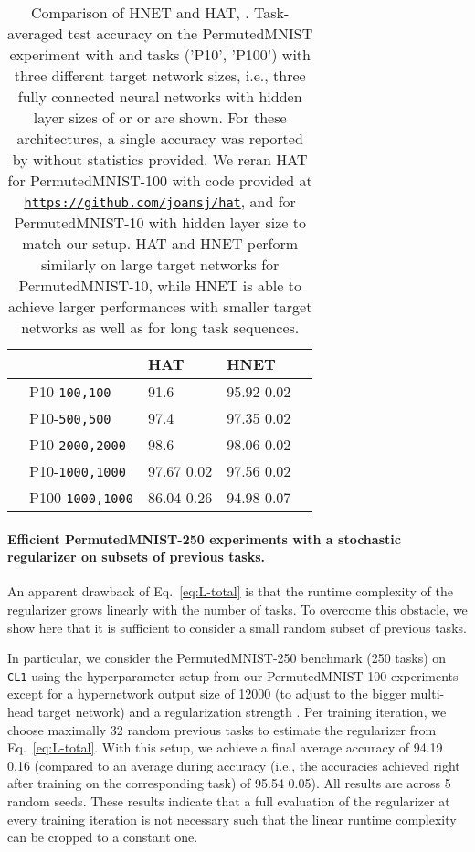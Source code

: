 \documentclass{article}
\begin{document}
\begin{table*}[ht!]
 \centering
  \caption{Comparison of HNET and HAT, \citet{pmlr-v80-serra18a}. Task-averaged test accuracy on the PermutedMNIST experiment with  and  tasks ('P10', 'P100') with three different target network sizes, i.e., three fully connected neural networks with hidden layer sizes of  or  or  are shown. For these architectures, a single accuracy was reported by \citet{pmlr-v80-serra18a} without statistics provided. We reran HAT for PermutedMNIST-100 with code provided at \texttt{\href{https://github.com/joansj/hat}{https://github.com/joansj/hat}}, and for PermutedMNIST-10 with hidden layer size  to match our setup. HAT and HNET perform similarly on large target networks for PermutedMNIST-10, while HNET is able to achieve larger performances with smaller target networks as well as for long task sequences.}
  \begin{small}
  \begin{tabular}{llp{1.62cm}p{1.62cm}p{1.65cm}} \toprule
     & & \textbf{HAT} & \textbf{HNET} \\ \midrule \midrule
    \multirow{3}{*}{}
    & P10-\texttt{100,100} & 91.6  & 95.92   0.02  \\
    & P10-\texttt{500,500} & 97.4  & 97.35   0.02 \\
    & P10-\texttt{2000,2000} &  98.6  & 98.06   0.02 \\
    \midrule
    \multirow{3}{*}{} 
    & P10-\texttt{1000,1000} &  97.67  0.02 & 97.56   0.02 \\
    & P100-\texttt{1000,1000} & 86.04   0.26 & 94.98   0.07 \\
    \bottomrule
  \end{tabular}
  \label{tab:hat_accs}
  \end{small}
\end{table*}

\paragraph{Efficient PermutedMNIST-250 experiments with a stochastic regularizer on subsets of previous tasks.} An apparent drawback of Eq.~\ref{eq:L-total} is that the runtime complexity of the regularizer grows linearly with the number of tasks. To overcome this obstacle, we show here that it is sufficient to consider a small random subset of previous tasks.

In particular, we consider the PermutedMNIST-250 benchmark (250 tasks) on \texttt{CL1} using the hyperparameter setup from our PermutedMNIST-100 experiments except for a hypernetwork output size of 12000 (to adjust to the bigger multi-head target network) and a regularization strength . Per training iteration, we choose maximally 32 random previous tasks to estimate the regularizer from Eq.~\ref{eq:L-total}. With this setup, we achieve a final average accuracy of 94.19  0.16 (compared to an average during accuracy (i.e., the accuracies achieved right after training on the corresponding task) of 95.54  0.05). All results are across 5 random seeds. These results indicate that a full evaluation of the regularizer at every training iteration is not necessary such that the linear runtime complexity can be cropped to a constant one.
\end{document}
